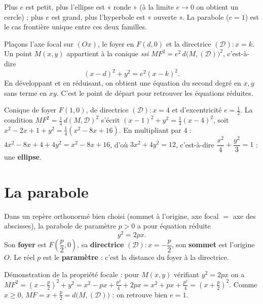 \begin{remarque}
Plus $e$ est petit, plus l'ellipse est « ronde » (à la limite $e\to0$ on obtient un
cercle) ; plus $e$ est grand, plus l'hyperbole est « ouverte ». La parabole ($e=1$) est le
cas frontière unique entre ces deux familles.
\end{remarque}

\begin{theoreme}
Plaçons l'axe focal sur $(Ox)$, le foyer en $F(d,0)$ et la directrice
$(\mathcal D):x=k$. Un point $M(x,y)$ appartient à la conique \emph{ssi}
$MF^{2}=e^{2}\,d\big(M,(\mathcal D)\big)^{2}$, c'est-à-dire
\[
(x-d)^{2}+y^{2}=e^{2}(x-k)^{2}.
\]
En développant et en réduisant, on obtient une équation du second degré en $x,y$ sans
terme en $xy$. C'est le point de départ pour retrouver les équations réduites.
\end{theoreme}

\begin{exemple}
Conique de foyer $F(1,0)$, de directrice $(\mathcal D):x=4$ et d'excentricité $e=\tfrac12$.
La condition $MF^{2}=\tfrac14\,d(M,\mathcal D)^{2}$ s'écrit
$(x-1)^{2}+y^{2}=\tfrac14(x-4)^{2}$, soit
$x^{2}-2x+1+y^{2}=\tfrac14(x^{2}-8x+16)$. En multipliant par $4$ :
$4x^{2}-8x+4+4y^{2}=x^{2}-8x+16$, d'où $3x^{2}+4y^{2}=12$, c'est-à-dire
$\dfrac{x^{2}}{4}+\dfrac{y^{2}}{3}=1$ : une \textbf{ellipse}.
\end{exemple}

\section{La parabole}

\begin{theoreme}
Dans un repère orthonormé bien choisi (sommet à l'origine, axe focal $=$ axe des
abscisses), la parabole de paramètre $p>0$ a pour équation réduite
\[
y^{2}=2px.
\]
Son \textbf{foyer} est $F\!\left(\dfrac p2,0\right)$, sa \textbf{directrice}
$(\mathcal D):x=-\dfrac p2$, son \textbf{sommet} est l'origine $O$. Le réel $p$ est le
\textbf{paramètre} : c'est la distance du foyer à la directrice.
\end{theoreme}

\begin{remarque}
Démonstration de la propriété focale : pour $M(x,y)$ vérifiant $y^{2}=2px$ on a
$MF^{2}=\left(x-\tfrac p2\right)^{2}+y^{2}=x^{2}-px+\tfrac{p^{2}}4+2px
=x^{2}+px+\tfrac{p^{2}}4=\left(x+\tfrac p2\right)^{2}$. Comme $x\ge0$,
$MF=x+\tfrac p2=d\big(M,(\mathcal D)\big)$ : on retrouve bien $e=1$.
\end{remarque}

